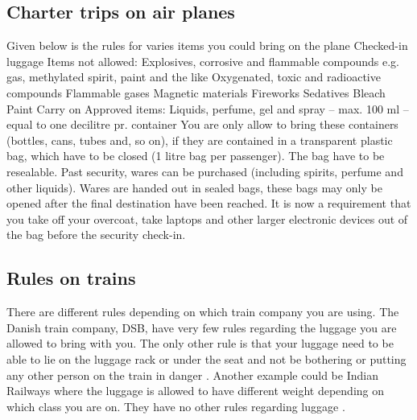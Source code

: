 \subsection{Charter trips on air planes}
Given below is the rules for varies items you could bring on the plane
\newline
\newline
Checked-in luggage
\newline
Items not allowed:
\newline
Explosives, corrosive and flammable compounds e.g. gas, methylated spirit, paint and the like  
\newline
Oxygenated, toxic and radioactive compounds 
\newline
Flammable gases 
\newline
Magnetic materials 
\newline
Fireworks 
\newline
Sedatives 
\newline
Bleach 
\newline
Paint
\newline\newline
Carry on
\newline
Approved items:
\newline
Liquids, perfume, gel and spray – max. 100 ml – equal to one decilitre pr. container \newline
You are only allow to bring these containers (bottles, cans, tubes and, so on), if they are contained in a transparent plastic bag, which have to be closed (1 litre bag per passenger).
The bag have to be resealable.
\newline
Past security, wares can be purchased (including spirits, perfume and other liquids). Wares are handed out in sealed bags, these bags may only be opened after the final destination have been reached.
\newline
It is now a requirement that you take off your overcoat, take laptops and other larger electronic devices out of the bag before the security check-in.\\
\citep{Prohibited_luggage}

\subsection{Rules on trains}

There are different rules depending on which train company you are using. 
\newline
The Danish train company, DSB, have very few rules regarding the luggage you are allowed to bring with you. 
\newline\newline
The only other rule is that your luggage need to be able to lie on the luggage rack or under the seat and not be bothering or putting any other person on the train in danger \citep{rulestrain}.
\newline\newline
Another example could be Indian Railways where the luggage is allowed to have different weight depending on which class you are on. They have no other rules regarding luggage \citep{idianrules}.